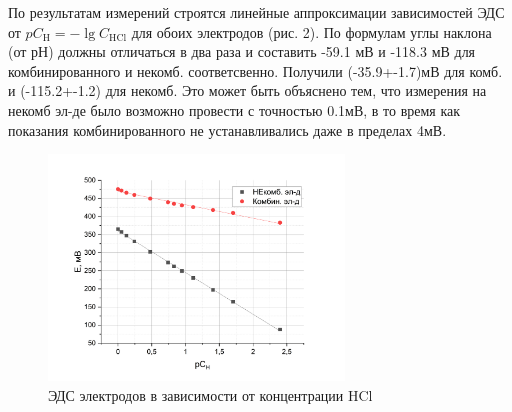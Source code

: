 \documentclass[a4paper, 12pt]{article}
\begin{document}
По результатам измерений строятся линейные аппроксимации зависимостей ЭДС от $p C_{\mathrm{H}}=-\lg C_{\mathrm{HCl}}$ для обоих электродов (рис. 2). По формулам углы наклона (от рН) должны отличаться в два раза и составить -59.1 мВ и -118.3 мВ для комбинированного и некомб. соответсвенно. Получили (-35.9+-1.7)мВ для комб. и (-115.2+-1.2) для некомб. Это может быть объяснено тем, что измерения на некомб эл-де было возможно провести с точностью 0.1мВ, в то время как показания комбинированного не устанавливались даже в пределах 4мВ. 

\begin{figure}
    \begin{center}
    \includegraphics[width=0.7\textwidth]{2.1.png}
    \end{center}
    \caption{ЭДС электродов в зависимости от концентрации HCl}
\end{figure}
\end{document}

